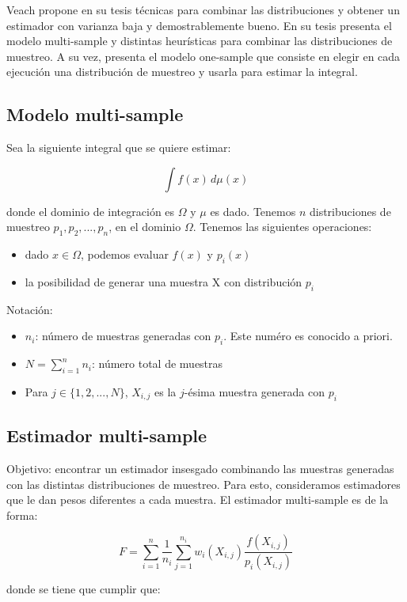 \documentclass{article}
\begin{document}
Veach propone en su tesis técnicas para combinar las distribuciones y obtener un estimador con varianza baja y demostrablemente bueno.
En su tesis presenta el modelo multi-sample y distintas heurísticas para combinar las distribuciones de muestreo.
A su vez, presenta el modelo one-sample que consiste en elegir en cada ejecución una distribución de muestreo y usarla para estimar la integral.

\subsection{Modelo multi-sample}

Sea la siguiente integral que se quiere estimar:

$$ \int f(x) \,d\mu(x)$$

donde el dominio de integración es $\Omega$ y $\mu$ es dado. Tenemos $n$ distribuciones de muestreo $p_{1}, p_{2}, ..., p_{n}$, en el dominio $\Omega$.
Tenemos las siguientes operaciones:
\begin{itemize}
    \item dado $x \in \Omega$, podemos evaluar $f(x)$ y $p_{i}(x)$
    \item la posibilidad de generar una muestra X con distribución $p_{i}$
\end{itemize}

Notación:
\begin{itemize}
    \item $n_{i}$: número de muestras generadas con $p_{i}$. Este numéro es conocido a priori.
    \item $N = \sum_{i=1}^{n} n_{i}$: número total de muestras
    \item Para $j \in \{1, 2, ..., N\}$, $X_{i,j}$ es la $j$-ésima muestra generada con $p_{i}$
\end{itemize}

\subsection{Estimador multi-sample}

Objetivo: encontrar un estimador insesgado combinando las muestras generadas con las distintas distribuciones de muestreo.
Para esto, consideramos estimadores que le dan pesos diferentes a cada muestra.
El estimador multi-sample es de la forma:

$$F = \sum_{i=1}^{n} \frac{1}{n_{i}} \sum_{j=1}^{n_{i}} w_{i}(X_{i,j}) \frac{f(X_{i,j})}{p_{i}(X_{i,j})}$$

donde se tiene que cumplir que:
\end{document}
